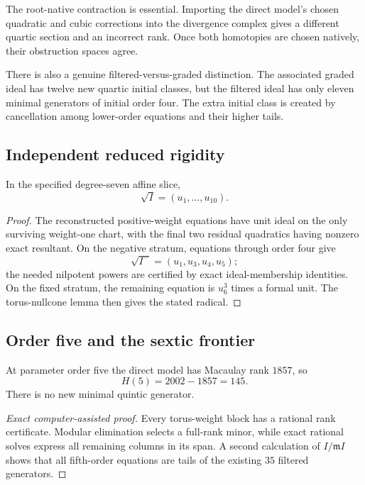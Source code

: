 The root-native contraction is essential.  Importing the direct model's
chosen quadratic and cubic corrections into the divergence complex gives a
different quartic section and an incorrect rank.  Once both homotopies are
chosen natively, their obstruction spaces agree.

There is also a genuine filtered-versus-graded distinction.  The associated
graded ideal has twelve new quartic initial classes, but the filtered ideal
has only eleven minimal generators of initial order four.  The extra initial
class is created by cancellation among lower-order equations and their
higher tails.

\subsection{Independent reduced rigidity}

\begin{corollary}
\label{cor:source-flow-reduced-rigidity}
In the specified degree-seven affine slice,
\[
\sqrt I=(u_1,\ldots,u_{10}).
\]
\end{corollary}

\begin{proof}
The reconstructed positive-weight equations have unit ideal on the only
surviving weight-one chart, with the final two residual quadratics having
nonzero exact resultant.  On the negative stratum, equations through order
four give
\[
\sqrt{I^-}=(u_1,u_3,u_4,u_5);
\]
the needed nilpotent powers are certified by exact ideal-membership
identities.  On the fixed stratum, the remaining equation is \(u_6^3\)
times a formal unit.  The torus-nullcone lemma then gives the stated radical.
\end{proof}

\subsection{Order five and the sextic frontier}

\begin{proposition}
\label{prop:source-flow-order-five}
At parameter order five the direct model has Macaulay rank \(1857\), so
\[
H(5)=2002-1857=145.
\]
There is no new minimal quintic generator.
\end{proposition}

\begin{proof}[Exact computer-assisted proof]
Every torus-weight block has a rational rank certificate.  Modular
elimination selects a full-rank minor, while exact rational solves express
all remaining columns in its span.  A second calculation of
\(I/\mathfrak m I\) shows that all fifth-order equations are tails of the
existing \(35\) filtered generators.
\end{proof}

